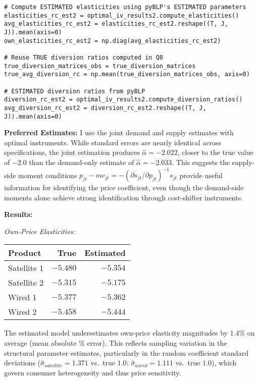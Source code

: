 \documentclass[english,11pt]{article}
\begin{document}
\begin{enumerate}
\begin{enumerate}
\begin{verbatim}
# Compute ESTIMATED elasticities using pyBLP's ESTIMATED parameters
elasticities_rc_est2 = optimal_iv_results2.compute_elasticities()
avg_elasticities_rc_est2 = elasticities_rc_est2.reshape((T, J, J)).mean(axis=0)
own_elasticities_rc_est2 = np.diag(avg_elasticities_rc_est2)

# Reuse TRUE diversion ratios computed in Q8
true_diversion_matrices_obs = true_diversion_matrices
true_avg_diversion_rc = np.mean(true_diversion_matrices_obs, axis=0)

# ESTIMATED diversion ratios from pyBLP
diversion_rc_est2 = optimal_iv_results2.compute_diversion_ratios()
avg_diversion_rc_est2 = diversion_rc_est2.reshape((T, J, J)).mean(axis=0)
\end{verbatim}

\textbf{Preferred Estimates:} I use the joint demand and supply estimates with optimal instruments. While standard errors are nearly identical across specifications, the joint estimation produces $\hat{\alpha} = -2.022$, closer to the true value of $-2.0$ than the demand-only estimate of $\hat{\alpha} = -2.033$. This suggests the supply-side moment conditions $p_{jt} - mc_{jt} = -(\partial s_{jt}/\partial p_{jt})^{-1} s_{jt}$ provide useful information for identifying the price coefficient, even though the demand-side moments alone achieve strong identification through cost-shifter instruments.

\textbf{Results:}

\textit{Own-Price Elasticities:}

\begin{center}
\begin{tabular}{lrr}
\hline
Product & True & Estimated \\
\hline
Satellite 1 & $-5.480$ & $-5.354$ \\
Satellite 2 & $-5.315$ & $-5.175$ \\
Wired 1 & $-5.377$ & $-5.362$ \\
Wired 2 & $-5.458$ & $-5.444$ \\
\hline
\end{tabular}
\end{center}

The estimated model underestimates own-price elasticity magnitudes by 1.4\% on average (mean absolute \% error). This reflects sampling variation in the structural parameter estimates, particularly in the random coefficient standard deviations ($\hat{\sigma}_{satellite} = 1.371$ vs.\ true $1.0$; $\hat{\sigma}_{wired} = 1.111$ vs.\ true $1.0$), which govern consumer heterogeneity and thus price sensitivity.


\end{enumerate}
\end{enumerate}
\end{document}
